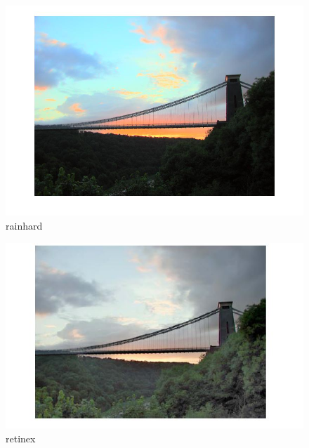      \begin{figure}[!htb]
      	\includegraphics[width=\linewidth]{images/rainhardhdr3}
      	\caption{rainhard }\label{fig:logtonemap}
      	\endminipage\hfill
      \end{figure}
      
      
      \begin{figure}[!htb]
      	\includegraphics[width=\linewidth]{images/retinex1}
      	\caption{retinex}\label{fig:logtonemap}
      	\endminipage\hfill
      \end{figure}
         